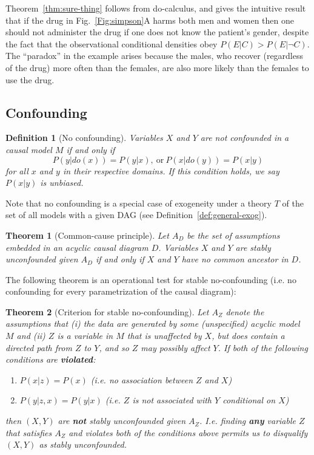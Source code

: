 \documentclass[11pt]{article}
\numberwithin{equation}{section}
\newtheorem{thm}{Theorem}[section]
\newtheorem{defn}{Definition}[section]
\begin{document}
Theorem~\ref{thm:sure-thing} follows from do-calculus, and gives the intuitive result that if the drug in Fig.~\ref{Fig:simpson}A harms both men and women then one should not administer the drug if one does not know the patient's gender, despite the fact that the observational conditional densities obey $P(E|C)>P(E|\neg C)$. The ``paradox'' in the example arises because the males, who recover (regardless of the drug) more often than the females, are also more likely than the females to use the drug.

\subsection{Confounding}

\begin{defn}[No confounding] \label{def:no-confounding}
Variables $X$ and $Y$ are not confounded in a causal model $M$ if and only if
\begin{equation}
P(y|do(x)) = P(y|x),\ \text{or}\ P(x|do(y)) = P(x|y)
\end{equation}
for all $x$ and $y$ in their respective domains. If this condition holds, we say $P(x|y)$ is unbiased. 
\end{defn}

Note that no confounding is a special case of exogeneity under a theory $T$ of the set of all models with a given DAG (see Definition~\ref{def:general-exog}). 

\begin{thm}[Common-cause principle]
Let $A_D$ be the set of assumptions embedded in an acyclic causal diagram $D$. Variables $X$ and $Y$ are stably unconfounded given $A_D$ if and only if $X$ and $Y$ have no common ancestor in $D$.
\end{thm}

The following theorem is an operational test for stable no-confounding (i.e. no confounding for every parametrization of the causal diagram):
\begin{thm}[Criterion for stable no-confounding]\label{thm:no-conf-criterion}
Let $A_Z$ denote the assumptions that (i) the data are generated by some (unspecified) acyclic model $M$ and (ii) $Z$ is a variable in $M$ that is unaffected by $X$, but does contain a directed path from $Z$ to $Y$, and so $Z$ may possibly affect $Y$. If both of the following conditions are \textbf{violated}:
\begin{enumerate}[noitemsep]
\item $P(x|z)=P(x)$ (i.e. no association between $Z$ and $X$)
\item $P(y|z,x)=P(y|x)$ (i.e. $Z$ is not associated with $Y$ conditional on $X$)
\end{enumerate}
then $(X,Y)$ are \textbf{not} stably unconfounded given $A_Z$. I.e. finding \textbf{any} variable $Z$ that satisfies $A_Z$ and violates both of the conditions above permits us to disqualify $(X,Y)$ as stably unconfounded.
\end{thm}
\end{document}
